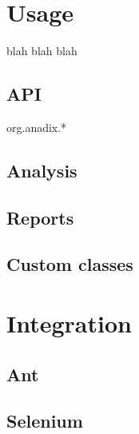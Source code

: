 \documentclass{report}
\begin{document}
\chapter*{Usage}
blah blah blah
\section*{API}
org.anadix.*
\section*{Analysis}

\section*{Reports}

\section*{Custom classes}

\chapter*{Integration}
\section*{Ant}
\section*{Selenium}
\end{document}
